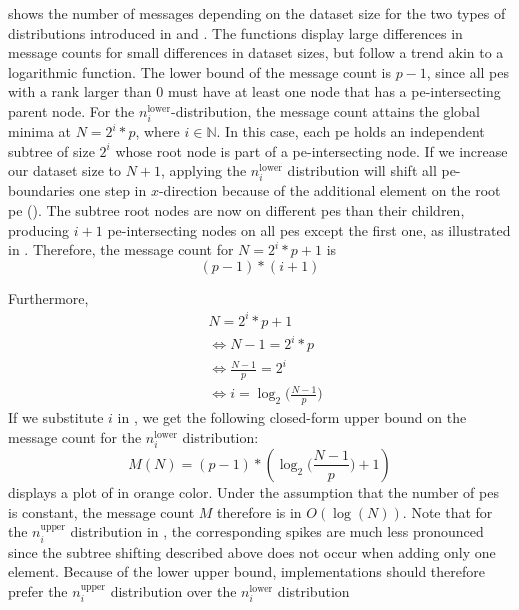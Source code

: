  shows the number of messages depending on the dataset size for the two types of distributions introduced in  and .
The functions display large differences in message counts for small differences in dataset sizes, but follow a trend akin to a logarithmic function.
The lower bound of the message count is $p - 1$, since all \glspl{pe} with a rank larger than $0$ must have at least one node that has a \gls{pe}-intersecting parent node.
For the $n_i^\textrm{lower}$-distribution, the message count attains the global minima at $N = 2^i * p$, where $i \in \mathbb{N}$.
In this case, each \gls{pe} holds an independent subtree of size $2^i$ whose root node is part of a \gls{pe}-intersecting node.
If we increase our dataset size to $N+1$, applying the $n_i^\textrm{lower}$ distribution will shift all \gls{pe}-boundaries one step in $x$-direction because of the additional element on the root \gls{pe} ().
The subtree root nodes are now on different \glspl{pe} than their children, producing $i + 1$ \gls{pe}-intersecting nodes on all \glspl{pe} except the first one, as illustrated in .
Therefore, the message count for $N = 2^i * p + 1$ is 
\begin{equation}
\label{eq:messageCountI}
(p - 1) * (i + 1)
\end{equation}

Furthermore,
\begin{align*}
&N = 2^i * p + 1 \\ 
&\Leftrightarrow N - 1 = 2^i * p \\
&\Leftrightarrow \frac{N - 1}{p} = 2^i \\
&\Leftrightarrow i = \log_2 \big(\frac{N - 1}{p}\big)
\end{align*}
If we substitute $i$ in , we get the following closed-form upper bound on the message count for the $n_i^\textrm{lower}$ distribution:
\begin{equation}
\label{eq:upperBoundLowerDistribution}
M(N) = (p - 1) * (\log_2 \Big( \frac{N - 1}{p} \Big) + 1)
\end{equation}
 displays a plot of   in orange color.
Under the assumption that the number of \glspl{pe} is constant, the message count $M$ therefore is in $O(\log(N))$.
Note that for the $n_i^\textrm{upper}$ distribution in , the corresponding spikes are much less pronounced since the subtree shifting described above does not occur when adding only one element.
Because of the lower upper bound, implementations should therefore prefer the $n_i^\textrm{upper}$ distribution over the $n_i^\textrm{lower}$ distribution

